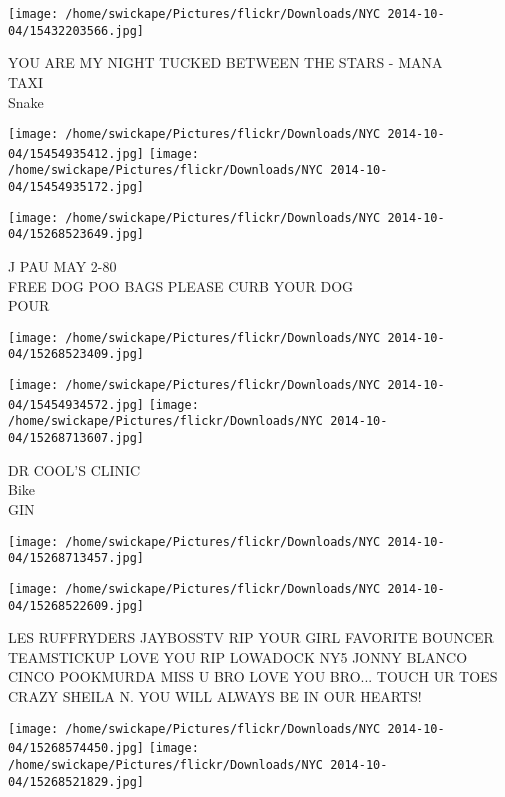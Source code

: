 \documentclass[10pt,letterpaper]{article}
\begin{document}
\vspace{0.25in}
\texttt{[image: /home/swickape/Pictures/flickr/Downloads/NYC 2014-10-04/15432203566.jpg]}

YOU ARE MY NIGHT TUCKED BETWEEN THE STARS {-} MANA\\
TAXI\\
Snake\\
\pagebreak

\texttt{[image: /home/swickape/Pictures/flickr/Downloads/NYC 2014-10-04/15454935412.jpg]}
\texttt{[image: /home/swickape/Pictures/flickr/Downloads/NYC 2014-10-04/15454935172.jpg]}

\texttt{[image: /home/swickape/Pictures/flickr/Downloads/NYC 2014-10-04/15268523649.jpg]}

J PAU MAY 2{-}80\\
FREE DOG POO BAGS PLEASE CURB YOUR DOG\\
POUR\\
\pagebreak

\texttt{[image: /home/swickape/Pictures/flickr/Downloads/NYC 2014-10-04/15268523409.jpg]}

\vspace{0.25in}
\texttt{[image: /home/swickape/Pictures/flickr/Downloads/NYC 2014-10-04/15454934572.jpg]}
\texttt{[image: /home/swickape/Pictures/flickr/Downloads/NYC 2014-10-04/15268713607.jpg]}

DR COOL'S CLINIC\\
Bike\\
GIN\\
\pagebreak

\texttt{[image: /home/swickape/Pictures/flickr/Downloads/NYC 2014-10-04/15268713457.jpg]}

\vspace{0.25in}
\texttt{[image: /home/swickape/Pictures/flickr/Downloads/NYC 2014-10-04/15268522609.jpg]}

LES RUFFRYDERS JAYBOSSTV RIP YOUR GIRL FAVORITE BOUNCER TEAMSTICKUP LOVE YOU RIP LOWADOCK NY5 JONNY BLANCO CINCO POOKMURDA MISS U BRO LOVE YOU BRO... TOUCH UR TOES\\
CRAZY SHEILA N. YOU WILL ALWAYS BE IN OUR HEARTS!\\
\pagebreak

\texttt{[image: /home/swickape/Pictures/flickr/Downloads/NYC 2014-10-04/15268574450.jpg]}
\texttt{[image: /home/swickape/Pictures/flickr/Downloads/NYC 2014-10-04/15268521829.jpg]}
\end{document}
